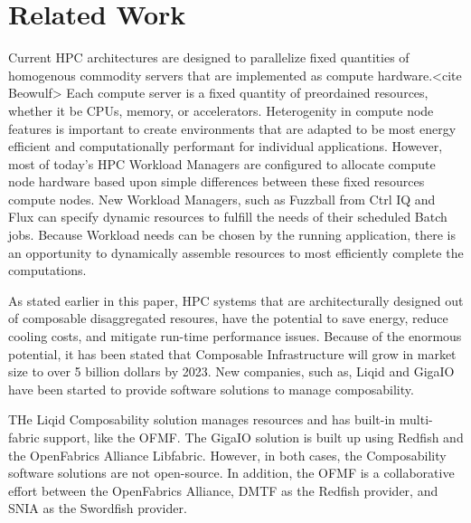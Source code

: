 \section{Related Work}
Current HPC architectures are designed to parallelize fixed quantities of homogenous commodity servers that are implemented as compute hardware.<cite Beowulf>  Each compute server is a fixed quantity of preordained resources, whether it be CPUs, memory, or accelerators.  Heterogenity in compute node features is important to create environments that are adapted to be most energy efficient and computationally performant for individual applications.  However, most of today's HPC Workload Managers are configured to allocate compute node hardware based upon simple differences between these fixed resources compute nodes.  New Workload Managers, such as Fuzzball from Ctrl IQ \cite{fuzzball} and Flux \cite{flux} can specify dynamic resources to fulfill the needs of their scheduled Batch jobs.  Because Workload needs can be chosen by the running application, there is an opportunity to dynamically assemble resources to most efficiently complete the computations.
 
As stated earlier in this paper, HPC systems that are architecturally designed out of composable disaggregated resoures, have the potential to save energy, reduce cooling costs, and mitigate run-time performance issues.  Because of the enormous potential, it has been stated that Composable Infrastructure will grow in market size to over 5 billion dollars by 2023.\cite{rlinker} New companies, such as, Liqid \cite{liqid} and GigaIO \cite{gigaio} have been started to provide software solutions to manage composability.  

THe Liqid Composability solution manages resources and has built-in multi-fabric support, like the OFMF.\cite {liqidmf} The GigaIO solution is built up using Redfish and the OpenFabrics Alliance Libfabric.  However, in both cases, the Composability software solutions are not open-source.  In addition, the OFMF is a collaborative effort between the OpenFabrics Alliance, DMTF as the Redfish provider, and SNIA as the Swordfish provider.








 
